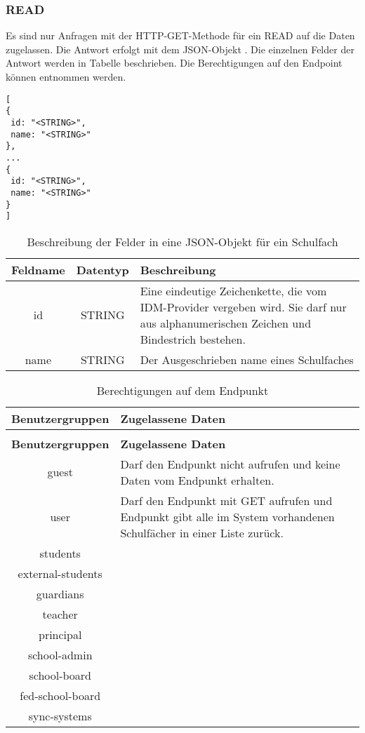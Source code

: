 \subsubsection{READ}
\label{sec:rest:api:school-subjects:read}
Es sind nur Anfragen mit der HTTP-GET-Methode für ein READ auf die Daten zugelassen.
Die Antwort erfolgt mit dem JSON-Objekt . Die einzelnen Felder der Antwort werden in Tabelle  beschrieben.
Die Berechtigungen auf den Endpoint können  entnommen werden.

\begin{lstlisting}[caption={JSON-Antwort für einen GET-Aufruf der Route /api/school-subjects},label={lst:code:rest:api:school-subjects:read:ret},frame=tlrb]
[
{
 id: "<STRING>",
 name: "<STRING>"
},
...
{
 id: "<STRING>",
 name: "<STRING>"
}
]
\end{lstlisting}
\begin{table}[!htb]
	\begin{tabularx}{\textwidth}{|c|c|X|}
		\hline
			\textbf{Feldname} & \textbf{Datentyp} & \textbf{Beschreibung} \\ \hline
			id & STRING & Eine eindeutige Zeichenkette, die vom IDM-Provider vergeben wird. Sie darf nur aus alphanumerischen Zeichen und Bindestrich bestehen.\\ \hline
			name & STRING & Der Ausgeschrieben name eines Schulfaches \\ \hline
	\end{tabularx}

		\caption{Beschreibung der Felder in eine JSON-Objekt für ein Schulfach}
		\label{tab:rest:api:school-subjects:read:ret:json}
\end{table}
\begin{longtable}{|c|p{}|}
		\caption{Berechtigungen auf dem Endpunkt}
		\label{tab:rest:api:school-subjects:read:right} \\
\hline
\textbf{Benutzergruppen} & \textbf{Zugelassene Daten} \\ \hline
\endfirsthead
		\caption{Berechtigungen auf dem Endpunkt}\\
\hline
\textbf{Benutzergruppen} & \textbf{Zugelassene Daten} \\ \hline
\endhead
guest & Darf den Endpunkt nicht aufrufen und keine Daten vom Endpunkt erhalten. \\ \hline
user & Darf den Endpunkt mit GET aufrufen und Endpunkt gibt alle im System vorhandenen Schulfächer in einer Liste zurück. \\ \hline
students &  \\ \hline
external-students &  \\ \hline
guardians &  \\ \hline
teacher &  \\ \hline
principal &  \\ \hline
school-admin &  \\ \hline
school-board &  \\ \hline
fed-school-board &  \\ \hline
sync-systems &  \\ \hline
	\end{longtable}
